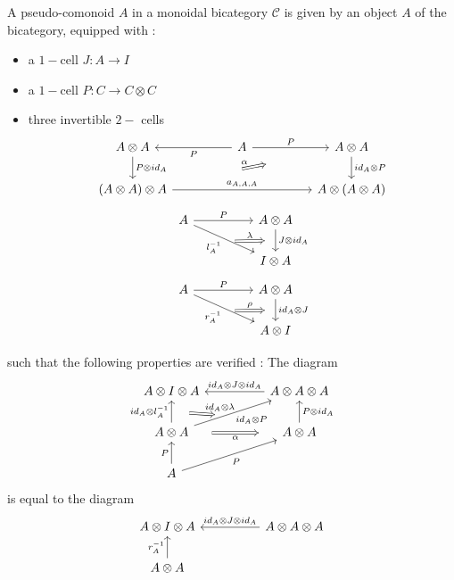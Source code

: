 \documentclass[10pt]{llncs}
\begin{document}
\begin{definition}
A pseudo-comonoid $A$ in a monoidal bicategory $\mathcal{C}$ is given by an object $A$ of the bicategory, equipped with :
\begin{itemize}
\item a $1-$cell $J: A \rightarrow I$
\item a $1-$cell $P:C \rightarrow C \otimes C$
\item three invertible $2-$ cells 
$$\begin{tikzcd}
A \otimes A
\arrow{d}{ P \otimes id_A}
&&
A
\arrow{ll}{P}
\arrow{rr}{P}
&&
A \otimes A
\arrow{d}{id_A \otimes P}
\\
(A \otimes A) \otimes A
\arrow{rrrr}{a_{A,A,A}}
\arrow[Rightarrow, shorten >=1.8cm, shorten <=2.0cm]{rrrru}{\alpha}
&&&&
A \otimes (A \otimes A)
\end{tikzcd}
$$
$$
\begin{tikzcd}
A
\arrow{rr}{P}
\arrow[swap]{rrd}{l_{A}^{-1}}[name=A]{}
&&
A \otimes A
\arrow{d}{J \otimes id_A}[name=B]{}
\\
&&
I \otimes A
\arrow[Rightarrow, from=A,to=B, shorten >=0.3cm, shorten <=0.3cm]{}{\lambda}
\end{tikzcd}
$$
$$
\begin{tikzcd}
A
\arrow{rr}{P}
\arrow[swap]{rrd}{r_{A}^{-1}}[name=A]{}
&&
A \otimes A
\arrow{d}{  id_A\otimes J}[name=B]{}
\\
&&
A \otimes I
\arrow[Rightarrow, from=A,to=B, shorten >=0.3cm, shorten <=0.3cm]{}{\rho}
\end{tikzcd}
$$
\end{itemize}
such that the following properties are verified : 
The diagram $$
\begin{tikzcd}
A \otimes I \otimes A
&&
A \otimes A \otimes A
\arrow[swap]{ll}{id_A \otimes J \otimes id_A}
\\
A \otimes A
\arrow{u}{id_A \otimes l_{A}^{-1}}[name=A]{}
\arrow[Rightarrow, swap,shorten >=0.5cm, shorten <=0.5cm]{rr}{\alpha}
\arrow[swap]{urr}{id_A \otimes P}[name=B]{}
&&
A \otimes A
\arrow[swap]{u}{P \otimes id_A}
\\
A
\arrow{u}{P}
\arrow[swap]{urr}{P}
\arrow[Rightarrow, from=A,to=B, shorten >=0.5cm, shorten <=0.5cm]{}{id_A \otimes \lambda}
\end{tikzcd}
$$
is equal to the diagram
$$
\begin{tikzcd}
A \otimes I \otimes A
&&
A \otimes A \otimes A
\arrow[swap]{ll}{id_A \otimes J \otimes id_A}
\\
A \otimes A
\arrow{u}{r_{A}^{-1}}[name=A]{}

\end{tikzcd}$$
\end{definition}
\end{document}
